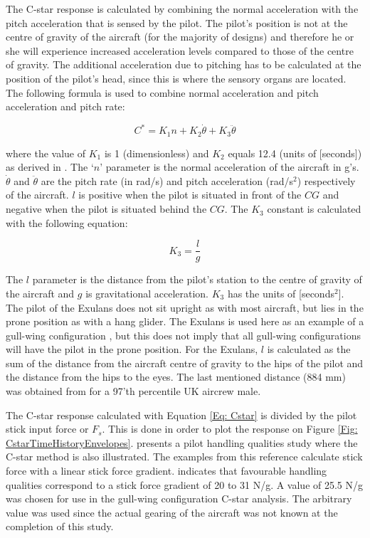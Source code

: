\documentclass{report}
\begin{document}
The C-star response is calculated by combining the normal acceleration with the pitch acceleration that is sensed by the pilot.  The pilot's position is not at the centre of gravity of the aircraft (for the majority of designs) and therefore he or she will experience increased acceleration levels compared to those of the centre of gravity. The additional acceleration due to pitching has to be calculated at the position of the pilot's head, since this is where the sensory organs are located.  The following formula is used to combine normal acceleration and pitch acceleration and pitch rate:

\begin{equation}\label{Eq: Cstar}
	C^* = K_1 n + K_2 \dot{\theta} + K_3 \ddot{\theta}
\end{equation}


where the value of $K_1$ is 1 (dimensionless) and $K_2$ equals 12.4 (units of [seconds]) as derived in .  The `$n$' parameter is the normal acceleration of the aircraft in g's.  $\dot{\theta}$ and $\ddot{\theta}$ are the pitch rate (in rad/s) and pitch acceleration (rad/s$^2$) respectively of the aircraft.  $l$ is positive when the pilot is situated in front of the $CG$ and negative when the pilot is situated behind the $CG$.  The $K_3$ constant is calculated with the following equation:

\begin{equation}\label{Eq: CstarK3}
	K_3 = \frac{l}{g}
\end{equation}

The $l$ parameter is the distance from the pilot's station to the centre of gravity of the aircraft and $g$ is gravitational acceleration.  $K_3$ has the units of [seconds$^2$].  The pilot of the Exulans does not sit upright as with most aircraft, but lies in the prone position as with a hang glider.  The Exulans is used here as an example of a gull-wing configuration , but this does not imply that all gull-wing configurations will have the pilot in the prone position.  For the Exulans, $l$ is calculated as the sum of the distance from the aircraft centre of gravity to the hips of the pilot and the distance from the hips to the eyes.  The last mentioned distance (884 mm) was obtained from \cite{DEFSTANhuman} for a 97'th percentile UK aircrew male.  

The C-star response calculated with Equation \ref{Eq: Cstar} is divided by the pilot stick input force or $F_s$.  This is done in order to plot the response on Figure \ref{Fig: CstarTimeHistoryEnvelopes}.  \cite{NealSmith} presents a pilot handling qualities study where the C-star method is also illustrated.  The examples from this reference calculate stick force with a linear stick force gradient.   indicates that favourable handling qualities correspond to a stick force gradient of 20 to 31 N/g.  A value of 25.5 N/g was chosen for use in the gull-wing configuration C-star analysis.  The arbitrary value was used since the actual gearing of the aircraft was not known at the completion of this study.   
\end{document}
